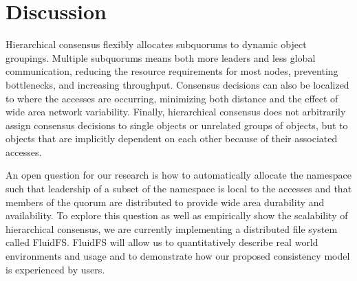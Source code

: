 \documentclass[11pt,letterpaper]{article}
\begin{document}
\section{Discussion}

Hierarchical consensus flexibly allocates subquorums to dynamic object groupings.
Multiple subquorums means both more leaders and less global communication, reducing the
resource requirements for most nodes, preventing bottlenecks, and increasing throughput.
Consensus decisions can also be localized to where the accesses are occurring,
minimizing both distance and the effect of wide area network variability.
Finally, hierarchical consensus does not arbitrarily assign consensus decisions to single
objects or unrelated groups of objects, but to objects that are implicitly dependent on
each other because of their associated accesses.

An open question for our research is how to automatically allocate the namespace such that
leadership of a subset of the namespace is local to the accesses and that members of the
quorum are distributed to provide wide area durability and availability.
To explore this question as well as empirically show the scalability of hierarchical
consensus, we are currently implementing a distributed file system called FluidFS.
FluidFS will allow us to quantitatively describe real world environments and usage and
to demonstrate how our proposed consistency model is experienced by users.



\end{document}
